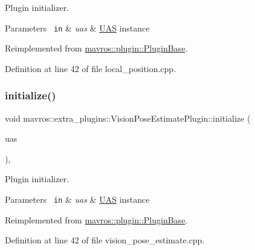 Plugin initializer. 


\begin{DoxyParams}[1]{Parameters}
\mbox{\texttt{ in}}  & {\em uas} & {\ttfamily \mbox{\hyperlink{classmavros_1_1UAS}{U\+AS}}} instance \\
\hline
\end{DoxyParams}


Reimplemented from \mbox{\hyperlink{group__plugin_gad5313a41da4d26acbbabf008cdc21e82}{mavros\+::plugin\+::\+Plugin\+Base}}.



Definition at line 42 of file local\+\_\+position.\+cpp.

\mbox{\label{group__plugin_gac952eeee9513bc64dffeec777c8404dc}} 
\subsubsection{\texorpdfstring{initialize()}{initialize()}\hspace{0.1cm}{\footnotesize\ttfamily [24/41]}}
{\footnotesize\ttfamily void mavros\+::extra\+\_\+plugins\+::\+Vision\+Pose\+Estimate\+Plugin\+::initialize (\begin{DoxyParamCaption}\item[{\mbox{\hyperlink{classmavros_1_1UAS}{U\+AS}} \&}]{uas }\end{DoxyParamCaption})\hspace{0.3cm}{\ttfamily [inline]}, {\ttfamily [virtual]}}



Plugin initializer. 


\begin{DoxyParams}[1]{Parameters}
\mbox{\texttt{ in}}  & {\em uas} & {\ttfamily \mbox{\hyperlink{classmavros_1_1UAS}{U\+AS}}} instance \\
\hline
\end{DoxyParams}


Reimplemented from \mbox{\hyperlink{group__plugin_gad5313a41da4d26acbbabf008cdc21e82}{mavros\+::plugin\+::\+Plugin\+Base}}.



Definition at line 42 of file vision\+\_\+pose\+\_\+estimate.\+cpp.

\mbox{\label{group__plugin_gaf4feaba098393f1b9f496e7ab47781a3}} 
